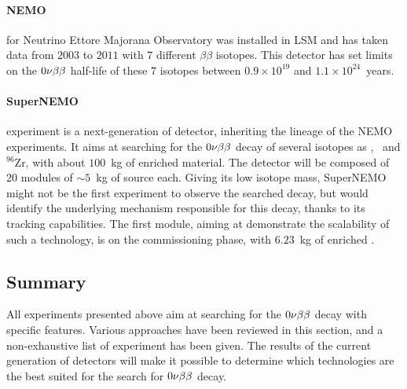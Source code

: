 \paragraph{NEMO} for Neutrino Ettore Majorana Observatory was installed in LSM and has taken data from $2003$ to $2011$ with $7$ different $\beta\beta$ isotopes.
This detector has set limits on the $0\nu\beta\beta$ half-life of these $7$ isotopes between $0.9\times 10^{19}$ and $1.1\times 10^{24}$~years.

\paragraph{SuperNEMO} experiment is a next-generation of detector, inheriting the lineage of the NEMO experiments.
It aims at searching for the $0\nu\beta\beta$ decay of several isotopes as \Se, \Nd\ and $^{96}$Zr, with about $100$~kg of enriched material.
The detector will be composed of $20$ modules of $\sim 5$~kg of source each.
Giving its low isotope mass, SuperNEMO might not be the first experiment to observe the searched decay, but would identify the underlying mechanism responsible for this decay, thanks to its tracking capabilities.
The first module, aiming at demonstrate the scalability of such a technology, is on the commissioning phase, with $6.23$~kg of enriched \Se.

\subsection{Summary}

All experiments presented above aim at searching for the $0\nu\beta\beta$ decay with specific features.
Various approaches have been reviewed in this section, and a non-exhaustive list of experiment has been given.
The results of the current generation of detectors will make it possible to determine which technologies are the best suited for the search for $0\nu\beta\beta$ decay.



